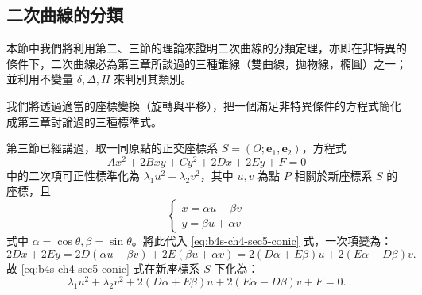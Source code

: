 \subsection{二次曲線的分類}\label{sec:b4s-4-5}

本節中我們將利用第二、三節的理論來證明二次曲線的分類定理，亦即在非特異的條件下，二次曲線必為第三章所談過的三種錐線（雙曲線，拋物線，橢圓）之一；並利用不變量 $\delta, \Delta, H$ 來判別其類別。

我們將透過適當的座標變換（旋轉與平移），把一個滿足非特異條件的方程式簡化成第三章討論過的三種標準式。

第三節已經講過，取一同原點的正交座標系 $S = (O; \mathbf{e}_1, \mathbf{e}_2)$，方程式
\begin{equation}
Ax^2 + 2Bxy + Cy^2 + 2Dx + 2Ey + F = 0
\label{eq:b4s-ch4-sec5-conic}
\end{equation}
中的二次項可正性標準化為 $\lambda_1 u^2 + \lambda_2 v^2$，其中 $u, v$ 為點 $P$ 相關於新座標系 $S$ 的座標，且
\[
\begin{cases}
x = \alpha u - \beta v \\
y = \beta u + \alpha v
\end{cases}
\]
式中 $\alpha = \cos\theta, \beta = \sin\theta$。將此代入 \eqref{eq:b4s-ch4-sec5-conic} 式，一次項變為：
\[
2Dx + 2Ey = 2D(\alpha u - \beta v) + 2E(\beta u + \alpha v) = 2(D\alpha + E\beta)u + 2(E\alpha - D\beta)v.
\]
故 \eqref{eq:b4s-ch4-sec5-conic} 式在新座標系 $S$ 下化為：
\begin{equation}
\lambda_1 u^2 + \lambda_2 v^2 + 2(D\alpha + E\beta)u + 2(E\alpha - D\beta)v + F = 0.
\label{eq:b4s-ch4-sec5-rotated}
\end{equation}

